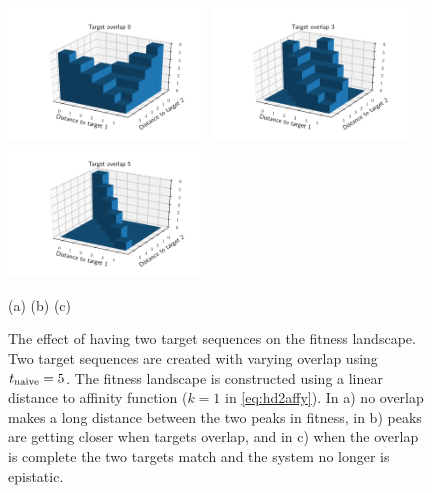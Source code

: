 \begin{figure}[!ht]
\begin{center}
\includegraphics[height=35mm]{figures/fitness_overlap0.pdf}
\includegraphics[height=35mm]{figures/fitness_overlap3.pdf}
\includegraphics[height=35mm]{figures/fitness_overlap5.pdf} \newline%
\end{center}
\vspace{-6mm} \hspace{26mm} (a) \hspace{39mm} (b) \hspace{39mm} (c)
    \caption{
    \label{fig:epistasis}
        The effect of having two target sequences on the fitness landscape.
        Two target sequences are created with varying overlap using $t_{\text{naive}}=5$.
        The fitness landscape is constructed using a linear distance to affinity function ($k=1$ in \eqref{eq:hd2affy}).
        In a) no overlap makes a long distance between the two peaks in fitness, in b) peaks are getting closer when targets overlap, and in c) when the overlap is complete the two targets match and the system no longer is epistatic. %
        }
\end{figure}



